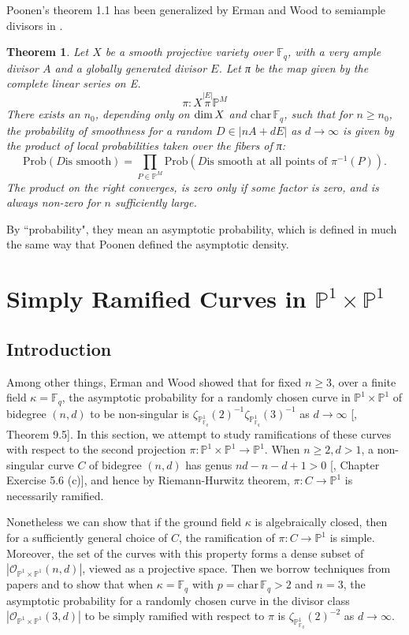\documentclass[12pt]{article}
\theoremstyle{plain}
\newtheorem{theorem}[equation]{Theorem}
\theoremstyle{definition}
\newcommand{\IF}{\mathbb{F}}
\newcommand{\IP}{\mathbb{P}}
\newcommand{\sO}{\mathcal{O}}
\renewcommand\dim{{\rm dim\,}}
\newcommand{\<}{\langle}
\renewcommand{\>}{\rangle}
\newcommand{\Prob}{\mathrm{Prob}}
\begin{document}
Poonen's theorem 1.1 has been generalized by Erman and Wood to semiample divisors in \cite{Wood}.  

\begin{theorem}
Let $X$ be a smooth projective variety over $\IF_q$, with a
very ample divisor $A$ and a globally generated divisor $E$. Let π be the map given by the
complete linear series on E.
$$ \pi : X \stackrel{|E|}{\pi} \IP^M $$
There exists an $n_0$, depending only on $\dim X$ and $\mathrm{char\,} \IF_q$, such that for $n \ge n_0$, the
probability of smoothness for a random $D \in |nA + dE|$ as $d \to \infty$ is given by the product of local probabilities taken over the fibers of π:
$$ \Prob(D \text{is smooth}) = \prod_{P \in \IP^M} \Prob(D \text{is smooth at all points of } \pi^{-1}(P)). $$
The product on the right converges, is zero only if some factor is zero, and is always non-zero for $n$ sufficiently large.
\end{theorem}

By ``probability", they mean an asymptotic probability, which is defined in much the same way that Poonen defined the asymptotic density. 


\section{Simply Ramified Curves in $\IP^1 \times \IP^1$}
\label{simplify-ramified}
\subsection{Introduction}
Among other things, Erman and Wood showed that for fixed $n \ge 3$, over a finite field $\kappa = \IF_q$, the asymptotic probability for a randomly chosen curve in $\IP^1 \times \IP^1$ of bidegree $(n, d)$ to be non-singular is $\zeta_{\IP^1_{\IF_q}}(2)^{-1}\zeta_{\IP^1_{\IF_q}}(3)^{-1}$ as $d \to \infty$ [\cite{Wood}, Theorem 9.5].
In this section, we attempt to study ramifications of these curves with respect to the second projection $\pi: \IP^1 \times \IP^1 \to \IP^1$. When $n \ge 2, d > 1$, a non-singular curve $C$ of bidegree $(n, d)$ has genus $nd - n - d + 1 >  0$ [\cite{Hartshorne}, Chapter \uppercase\expandafter{} Exercise 5.6 (c)], and hence by Riemann-Hurwitz theorem, $\pi : C \to \IP^1$ is necessarily ramified. 

Nonetheless we can show that if the ground field $\kappa$ is algebraically closed, then for a sufficiently general choice of $C$, the ramification of $\pi : C \to \IP^1$ is simple. Moreover, the set of the curves with this property forms a dense subset of $|\sO_{\IP^1 \times \IP^1}(n, d)|$, viewed as a projective space. Then we borrow techniques from papers \cite{Poonen} and \cite{Wood} to show that when $\kappa = \IF_q$ with $p = \mathrm{char}\, \IF_q > 2$ and $n = 3$, the asymptotic probability for a randomly chosen curve in the divisor class $|\sO_{\IP^1 \times \IP^1}(3, d)|$ to be simply ramified with respect to $\pi$ is $\zeta_{\IP^1_{\IF_q}}(2)^{-2}$ as $d \to \infty$. 
\end{document}

